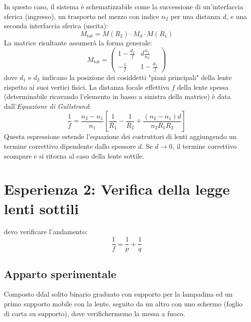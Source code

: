 \documentclass[openany,a4paper,12pt]{book}
\begin{document}
In questo caso, il sistema è schematizzabile come la successione di un'interfaccia sferica (ingresso), un trasporto nel mezzo con indice $n_2$ per una distanza $d$, e una seconda interfaccia sferica (uscita):
\begin{equation}
    M_{\text{tot}} = M(R_2) \cdot M_d \cdot M(R_1)
\end{equation}
La matrice risultante assumerà la forma generale:
\begin{equation}
    M_{\text{tot}} = 
    \begin{pmatrix}
        1 - \frac{d_2}{f} & d \frac{n_1}{n_2} \\[1ex]
        -\frac{1}{f} & 1 - \frac{d_1}{f}
    \end{pmatrix}
\end{equation}
dove $d_1$ e $d_2$ indicano la posizione dei cosiddetti "piani principali" della lente rispetto ai suoi vertici fisici. La distanza focale effettiva $f$ della lente spessa (determinabile ricavando l'elemento in basso a sinistra della matrice) è data dall'\textit{Equazione di Gullstrand}:
\begin{equation}
    \frac{1}{f} = \frac{n_2 - n_1}{n_1} \left[ \frac{1}{R_1} - \frac{1}{R_2} + \frac{(n_2 - n_1) d}{n_2 R_1 R_2} \right]
\end{equation}
Questa espressione estende l'equazione dei costruttori di lenti aggiungendo un termine correttivo dipendente dallo spessore $d$. Se $d \to 0$, il termine correttivo scompare e si ritorna al caso della lente sottile.
\section{Esperienza 2: Verifica della legge lenti sottili}
devo verificare l'andamento: 
\begin{equation}
    \frac{1}{f} = \frac{1}{p} + \frac{1}{q}
\end{equation}
\subsection*{Apparto sperimentale}
Composto ddal solito binario graduato con supporto per la lampadina ed un primo supporto mobile con la lente, seguito da un altro con uno schermo (foglio di carta su supporto), dove verifichermemo la messa a fuoco. 
\end{document}
